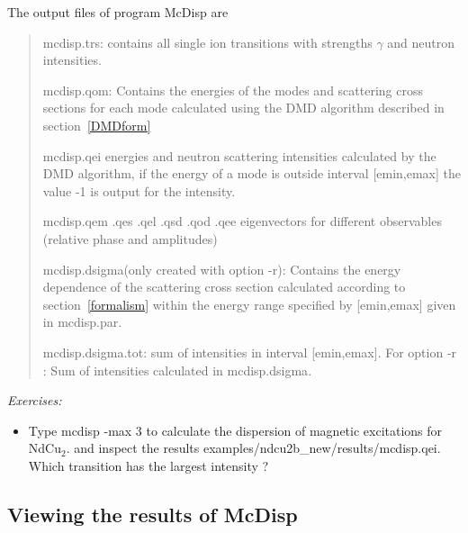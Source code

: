 The output files of program {\prg McDisp} are 

\begin{quote}
\item[{\prg mcdisp.trs}:] contains all single ion transitions with strengths $\gamma$ 
and neutron intensities.
\item [{\prg mcdisp.qom}:] Contains the energies of the modes and scattering cross sections  for each mode 
calculated using the DMD algorithm described in section~\ref{DMDform}
\item[{\prg mcdisp.qei}] energies and neutron scattering intensities calculated by the DMD algorithm, if 
        the energy of a mode is outside interval  [emin,emax] the value -1 is output for the intensity.
\item[{\prg mcdisp.qem .qes .qel .qsd .qod .qee}] eigenvectors for different observables (relative phase and amplitudes)
\item [{\prg mcdisp.dsigma}(only created with option {\prg -r}):] Contains the energy dependence of the scattering cross %
section
calculated according to section~\ref{formalism} within the energy range specified by [emin,emax] given in {\prg %
mcdisp.par}. 
\item [{\prg mcdisp.dsigma.tot}:] sum of intensities in interval  [emin,emax].  For option {\prg -r} : Sum of intensities calculated in {\prg %
mcdisp.dsigma}.
\end{quote}

\vspace{1cm}
{\em Exercises:}
\begin{itemize}
\item Type {\prg mcdisp -max 3} to
calculate the dispersion of magnetic excitations for NdCu$_2$.
and inspect the results
{\prg examples/ndcu2b\_new/results/mcdisp.qei}.
Which  transition has the largest intensity ?
\end{itemize}

\subsection{Viewing the results of McDisp}

